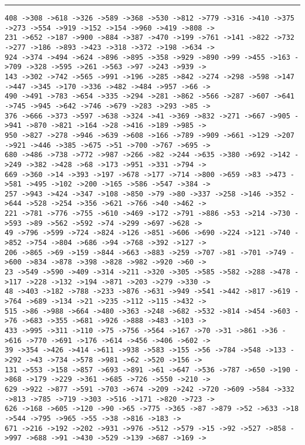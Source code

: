 \documentclass[letter, 12pt]{article}
\newenvironment{question}[1]{%
    \vspace{.2in}%
        \noindent{\bf #1}%
    \vspace{0.3em} \hrule \vspace{.1in}%
}{}
\begin{document}
\begin{question}{\large Appendix}
\begin{lstlisting}[style=CStyle]
408 ->308 ->618 ->326 ->589 ->368 ->530 ->812 ->779 ->316 ->410 ->375 ->273 ->554 ->919 ->152 ->154 ->960 ->419 ->808 ->
231 ->652 ->187 ->900 ->884 ->387 ->470 ->199 ->761 ->141 ->822 ->732 ->277 ->186 ->893 ->423 ->318 ->372 ->198 ->634 ->
924 ->374 ->494 ->624 ->896 ->895 ->358 ->929 ->890 ->99 ->455 ->163 ->709 ->328 ->595 ->261 ->563 ->97 ->243 ->939 ->
143 ->302 ->742 ->565 ->991 ->196 ->285 ->842 ->274 ->298 ->598 ->147 ->447 ->345 ->170 ->336 ->482 ->484 ->957 ->66 ->
490 ->491 ->783 ->654 ->335 ->294 ->281 ->862 ->566 ->287 ->607 ->641 ->745 ->945 ->642 ->746 ->679 ->283 ->293 ->85 ->
376 ->666 ->373 ->597 ->638 ->324 ->41 ->369 ->832 ->271 ->667 ->905 ->941 ->870 ->821 ->164 ->28 ->416 ->189 ->985 ->
950 ->827 ->278 ->946 ->639 ->608 ->166 ->789 ->909 ->661 ->129 ->207 ->921 ->446 ->385 ->675 ->51 ->700 ->767 ->695 ->
680 ->486 ->738 ->772 ->987 ->266 ->82 ->244 ->635 ->380 ->692 ->142 ->249 ->382 ->428 ->68 ->173 ->951 ->331 ->794 ->
669 ->360 ->14 ->393 ->197 ->678 ->177 ->714 ->800 ->659 ->83 ->473 ->581 ->495 ->102 ->200 ->165 ->586 ->547 ->384 ->
257 ->943 ->424 ->347 ->108 ->850 ->79 ->80 ->337 ->258 ->146 ->352 ->644 ->528 ->254 ->356 ->621 ->766 ->40 ->462 ->
221 ->781 ->776 ->755 ->610 ->469 ->172 ->791 ->886 ->53 ->214 ->730 ->593 ->89 ->562 ->592 ->74 ->299 ->697 ->628 ->
49 ->796 ->599 ->724 ->824 ->126 ->851 ->606 ->690 ->224 ->121 ->740 ->852 ->754 ->804 ->686 ->94 ->768 ->392 ->127 ->
206 ->865 ->69 ->159 ->844 ->663 ->883 ->259 ->707 ->81 ->701 ->749 ->600 ->834 ->878 ->398 ->828 ->982 ->920 ->60 ->
23 ->549 ->590 ->409 ->314 ->211 ->320 ->305 ->585 ->582 ->288 ->478 ->117 ->228 ->132 ->194 ->871 ->203 ->279 ->330 ->
48 ->403 ->182 ->788 ->233 ->876 ->631 ->949 ->541 ->442 ->817 ->619 ->764 ->689 ->134 ->21 ->235 ->112 ->115 ->432 ->
515 ->86 ->988 ->664 ->480 ->363 ->248 ->682 ->532 ->814 ->454 ->603 ->76 ->683 ->355 ->681 ->926 ->888 ->483 ->103 ->
433 ->995 ->311 ->110 ->75 ->756 ->564 ->167 ->70 ->31 ->861 ->36 ->616 ->770 ->691 ->176 ->614 ->456 ->406 ->602 ->
39 ->354 ->426 ->414 ->611 ->938 ->583 ->155 ->56 ->784 ->548 ->133 ->292 ->43 ->734 ->578 ->981 ->62 ->520 ->156 ->
131 ->553 ->158 ->857 ->693 ->891 ->61 ->647 ->536 ->787 ->650 ->190 ->868 ->179 ->229 ->361 ->685 ->726 ->550 ->210 ->
629 ->922 ->877 ->591 ->703 ->674 ->209 ->242 ->720 ->609 ->584 ->332 ->813 ->785 ->719 ->303 ->516 ->171 ->820 ->723 ->
626 ->168 ->605 ->120 ->90 ->65 ->775 ->365 ->87 ->879 ->52 ->633 ->18 ->544 ->795 ->965 ->55 ->38 ->816 ->183 ->
671 ->216 ->192 ->202 ->931 ->976 ->512 ->579 ->15 ->92 ->527 ->858 ->997 ->688 ->91 ->430 ->529 ->139 ->687 ->169 ->

\end{lstlisting}
\end{question}
\end{document}
